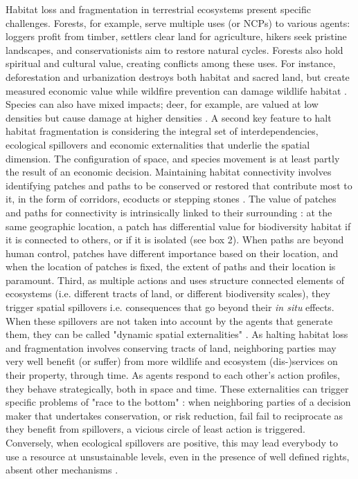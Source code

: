Habitat loss and fragmentation in terrestrial ecosystems present specific challenges. Forests, for example, serve multiple uses (or NCPs) to various agents: loggers profit from timber, settlers clear land for agriculture, hikers seek pristine landscapes, and conservationists aim to restore natural cycles. Forests also hold spiritual and cultural value, creating conflicts among these uses. For instance, deforestation and urbanization destroys both habitat and sacred land, but create measured economic value \citep{giglio_economics_2024} while wildfire prevention can damage wildlife habitat \citep{bradshaw2018}. Species can also have mixed impacts; deer, for example, are valued at low densities but cause damage at higher densities \citep{putman_identifying_2011}. 
A second key feature to halt habitat fragmentation is considering the integral set of interdependencies, ecological spillovers and economic externalities that underlie the spatial dimension. The configuration of space, and species movement is at least partly the result of an economic decision. Maintaining habitat connectivity involves identifying patches and paths to be conserved or restored that contribute most to it, in the form of corridors, ecoducts or stepping stones \citep{Turner2005, Turner2011}. The value of patches and paths for connectivity is intrinsically linked to their surrounding : at the same geographic location, a patch has differential value for biodiversity habitat if it is connected to others, or if it is isolated (see box 2). When paths are beyond human control, patches have different importance based on their location, and when the location of patches is fixed, the extent of paths and their location is paramount. Third, as multiple actions and uses structure connected elements of ecosystems (i.e. different tracts of land, or different biodiversity scales), they trigger spatial spillovers i.e. consequences that go beyond their \textit{in situ} effects. When these spillovers are not taken into account by the agents that generate them, they can be called "dynamic spatial externalities" \citep{sanchirico_bioeconomics_1999, costello_optimal_2008, costello_private_2017}. As halting habitat loss and fragmentation involves conserving tracts of land, neighboring parties may very well benefit (or suffer) from more wildlife and ecosystem (dis-)services on their property, through time. As agents respond to each other's action profiles, they behave strategically, both in space and time. These externalities can trigger specific problems of "race to the bottom" \citep{costello_private_2017} : when neighboring parties of a decision maker that undertakes conservation, or risk reduction, fail fail to reciprocate as they benefit from spillovers, a vicious circle of least action is triggered. Conversely, when ecological spillovers are positive, this may lead everybody to use a resource at unsustainable levels, even in the presence of well defined rights, absent other mechanisms \citep{janmaat_sharing_2005,kaffine_unitization_2010}. 
